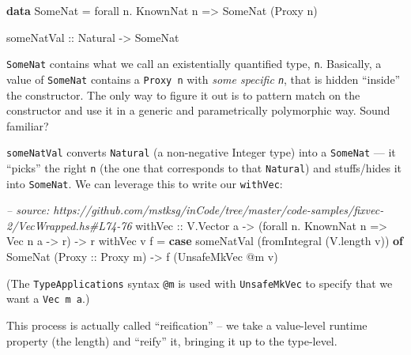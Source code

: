 \documentclass[]{article}
\newenvironment{Shaded}{}{}
\newcommand{\KeywordTok}[1]{\textcolor[rgb]{0.00,0.44,0.13}{\textbf{#1}}}
\newcommand{\DataTypeTok}[1]{\textcolor[rgb]{0.56,0.13,0.00}{#1}}
\newcommand{\CommentTok}[1]{\textcolor[rgb]{0.38,0.63,0.69}{\textit{#1}}}
\newcommand{\OtherTok}[1]{\textcolor[rgb]{0.00,0.44,0.13}{#1}}
\newcommand{\FunctionTok}[1]{\textcolor[rgb]{0.02,0.16,0.49}{#1}}
\newcommand{\NormalTok}[1]{#1}
\begin{document}
\begin{Shaded}
\begin{Highlighting}[]
\KeywordTok{data} \DataTypeTok{SomeNat} \FunctionTok{=}\NormalTok{ forall n}\FunctionTok{.} \DataTypeTok{KnownNat}\NormalTok{ n }\OtherTok{=>} \DataTypeTok{SomeNat}\NormalTok{ (}\DataTypeTok{Proxy}\NormalTok{ n)}

\OtherTok{someNatVal ::} \DataTypeTok{Natural} \OtherTok{->} \DataTypeTok{SomeNat}
\end{Highlighting}
\end{Shaded}

\texttt{SomeNat} contains what we call an existentially quantified type,
\texttt{n}. Basically, a value of \texttt{SomeNat} contains a \texttt{Proxy\ n}
with \emph{some specific \texttt{n}}, that is hidden ``inside'' the constructor.
The only way to figure it out is to pattern match on the constructor and use it
in a generic and parametrically polymorphic way. Sound familiar?

\texttt{someNatVal} converts \texttt{Natural} (a non-negative Integer type) into
a \texttt{SomeNat} --- it ``picks'' the right \texttt{n} (the one that
corresponds to that \texttt{Natural}) and stuffs/hides it into \texttt{SomeNat}.
We can leverage this to write our \texttt{withVec}:

\begin{Shaded}
\begin{Highlighting}[]
\CommentTok{-- source: https://github.com/mstksg/inCode/tree/master/code-samples/fixvec-2/VecWrapped.hs#L74-76}
\OtherTok{withVec ::} \DataTypeTok{V.Vector}\NormalTok{ a }\OtherTok{->}\NormalTok{ (forall n}\FunctionTok{.} \DataTypeTok{KnownNat}\NormalTok{ n }\OtherTok{=>} \DataTypeTok{Vec}\NormalTok{ n a }\OtherTok{->}\NormalTok{ r) }\OtherTok{->}\NormalTok{ r}
\NormalTok{withVec v f }\FunctionTok{=} \KeywordTok{case}\NormalTok{ someNatVal (fromIntegral (V.length v)) }\KeywordTok{of}
    \DataTypeTok{SomeNat}\NormalTok{ (}\DataTypeTok{Proxy}\OtherTok{ ::} \DataTypeTok{Proxy}\NormalTok{ m) }\OtherTok{->}\NormalTok{ f (}\DataTypeTok{UnsafeMkVec} \FunctionTok{@}\NormalTok{m v)}
\end{Highlighting}
\end{Shaded}

(The \texttt{TypeApplications} syntax \texttt{@m} is used with
\texttt{UnsafeMkVec} to specify that we want a \texttt{Vec\ m\ a}.)

This process is actually called ``reification'' -- we take a value-level runtime
property (the length) and ``reify'' it, bringing it up to the type-level.
\end{document}
